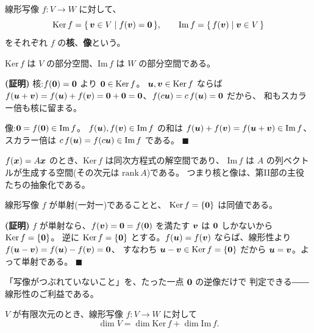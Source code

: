 \begin{teigi}[核と像]
線形写像 $f : V \to W$ に対して、
\[
\mathrm{Ker}\,f = \{\, \bm{v} \in V \mid f(\bm{v}) = \bm{0} \,\},
\qquad
\mathrm{Im}\,f = \{\, f(\bm{v}) \mid \bm{v} \in V \,\}
\]
をそれぞれ $f$ の\textbf{核}、\textbf{像}という。
\end{teigi}

\begin{teiri}\label{thm:kerim-sub}
$\mathrm{Ker}\,f$ は $V$ の部分空間、$\mathrm{Im}\,f$ は $W$ の部分空間である。
\end{teiri}

\noindent\textbf{(証明)}\quad
核:$f(\bm{0}) = \bm{0}$ より $\bm{0} \in \mathrm{Ker}\,f$。
$\bm{u}, \bm{v} \in \mathrm{Ker}\,f$ ならば
$f(\bm{u} + \bm{v}) = f(\bm{u}) + f(\bm{v}) = \bm{0} + \bm{0}
= \bm{0}$、$f(c\bm{u}) = c\,f(\bm{u}) = \bm{0}$ だから、
和もスカラー倍も核に留まる。

像:$\bm{0} = f(\bm{0}) \in \mathrm{Im}\,f$。
$f(\bm{u}), f(\bm{v}) \in \mathrm{Im}\,f$ の和は
$f(\bm{u}) + f(\bm{v}) = f(\bm{u} + \bm{v}) \in \mathrm{Im}\,f$、
スカラー倍は $c\,f(\bm{u}) = f(c\bm{u}) \in \mathrm{Im}\,f$ である。
$\blacksquare$

$f(\bm{x}) = A\bm{x}$ のとき、$\mathrm{Ker}\,f$ は同次方程式の解空間であり、
$\mathrm{Im}\,f$ は $A$ の列ベクトルが生成する空間(その次元は $\mathrm{rank}\,A$)である。
つまり核と像は、第II部の主役たちの抽象化である。

\begin{teiri}[単射性の判定]\label{thm:linmap-inj}
線形写像 $f$ が単射(一対一)であることと、
$\mathrm{Ker}\,f = \{\bm{0}\}$ は同値である。
\end{teiri}

\noindent\textbf{(証明)}\quad
$f$ が単射なら、$f(\bm{v}) = \bm{0} = f(\bm{0})$ を満たす
$\bm{v}$ は $\bm{0}$ しかないから $\mathrm{Ker}\,f = \{\bm{0}\}$。
逆に $\mathrm{Ker}\,f = \{\bm{0}\}$ とする。$f(\bm{u}) = f(\bm{v})$
ならば、線形性より
$f(\bm{u} - \bm{v}) = f(\bm{u}) - f(\bm{v}) = \bm{0}$、
すなわち $\bm{u} - \bm{v} \in \mathrm{Ker}\,f = \{\bm{0}\}$ だから
$\bm{u} = \bm{v}$。よって単射である。 $\blacksquare$

「写像がつぶれていないこと」を、たった一点 $\bm{0}$ の逆像だけで
判定できる――線形性のご利益である。

\begin{teiri}[次元定理]\label{thm:dimension}
$V$ が有限次元のとき、線形写像 $f : V \to W$ に対して
\[
\dim V = \dim \mathrm{Ker}\,f + \dim \mathrm{Im}\,f.
\]
\end{teiri}

